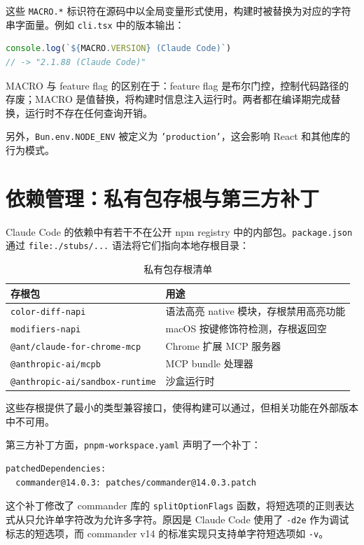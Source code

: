 这些 \texttt{MACRO.*} 标识符在源码中以全局变量形式使用，构建时被替换为对应的字符串字面量。例如 \texttt{cli.tsx} 中的版本输出：

\begin{lstlisting}[language=TypeScript]
console.log(`${MACRO.VERSION} (Claude Code)`)
// -> "2.1.88 (Claude Code)"
\end{lstlisting}

MACRO 与 feature flag 的区别在于：feature flag 是布尔门控，控制代码路径的存废；MACRO 是值替换，将构建时信息注入运行时。两者都在编译期完成替换，运行时不存在任何查询开销。

另外，\texttt{Bun.env.NODE\_ENV} 被定义为 \texttt{'production'}，这会影响 React 和其他库的行为模式。

\section{依赖管理：私有包存根与第三方补丁}

Claude Code 的依赖中有若干不在公开 npm registry 中的内部包。\texttt{package.json} 通过 \texttt{file:./stubs/...} 语法将它们指向本地存根目录：

\begin{table}[htbp]
\centering
\begin{tabularx}{\textwidth}{lX}
\toprule
\textbf{存根包} & \textbf{用途} \\
\midrule
\texttt{color-diff-napi} & 语法高亮 native 模块，存根禁用高亮功能 \\
\texttt{modifiers-napi} & macOS 按键修饰符检测，存根返回空 \\
\texttt{@ant/claude-for-chrome-mcp} & Chrome 扩展 MCP 服务器 \\
\texttt{@anthropic-ai/mcpb} & MCP bundle 处理器 \\
\texttt{@anthropic-ai/sandbox-runtime} & 沙盒运行时 \\
\bottomrule
\end{tabularx}
\caption{私有包存根清单}
\end{table}

这些存根提供了最小的类型兼容接口，使得构建可以通过，但相关功能在外部版本中不可用。

第三方补丁方面，\texttt{pnpm-workspace.yaml} 声明了一个补丁：

\begin{lstlisting}[language={}]
patchedDependencies:
  commander@14.0.3: patches/commander@14.0.3.patch
\end{lstlisting}

这个补丁修改了 commander 库的 \texttt{splitOptionFlags} 函数，将短选项的正则表达式从只允许单字符改为允许多字符。原因是 Claude Code 使用了 \texttt{-d2e} 作为调试标志的短选项，而 commander v14 的标准实现只支持单字符短选项如 \texttt{-v}。

